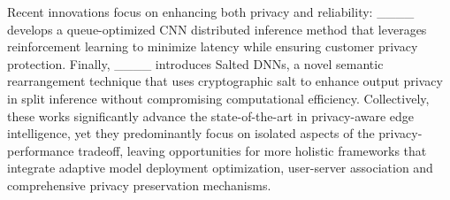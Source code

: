 Recent innovations focus on enhancing both privacy and reliability: ____ develops a queue-optimized CNN distributed inference method that leverages reinforcement learning to minimize latency while ensuring customer privacy protection. Finally, ____ introduces Salted DNNs, a novel semantic rearrangement technique that uses cryptographic salt to enhance output privacy in split inference without compromising computational efficiency. Collectively, these works significantly advance the state-of-the-art in privacy-aware edge intelligence, yet they predominantly focus on isolated aspects of the privacy-performance tradeoff, leaving opportunities for more holistic frameworks that integrate adaptive model deployment optimization, user-server association and comprehensive privacy preservation mechanisms.